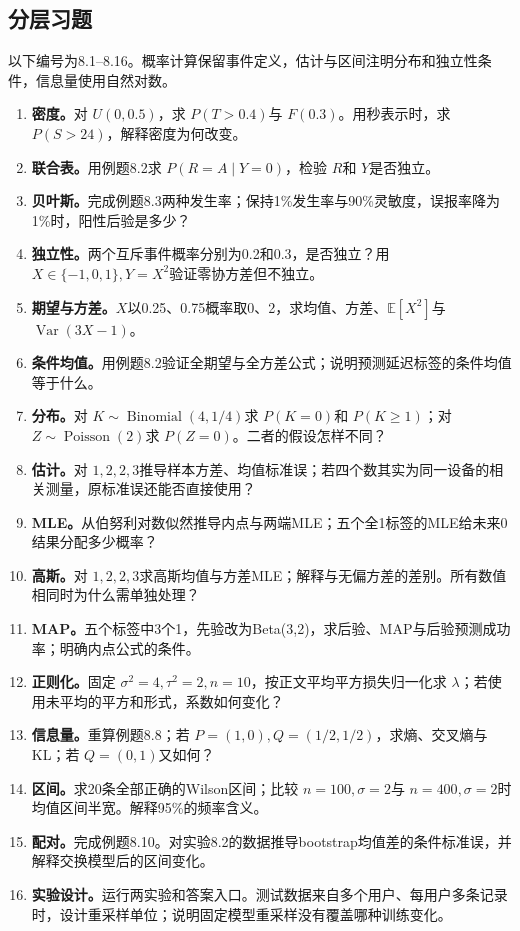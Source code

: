 \documentclass[UTF8,fontset=none,zihao=-4,a4paper]{ctexart}
\numberwithin{equation}{section}
\numberwithin{figure}{section}
\begin{document}
\subsection{分层习题}
以下编号为8.1--8.16。概率计算保留事件定义，估计与区间注明分布和独立性条件，信息量使用自然对数。
\begin{enumerate}[label=\textbf{8.\arabic*}]
\item \textbf{密度。}对 $U(0,0.5)$，求 $P(T>0.4)$与 $F(0.3)$。用秒表示时，求 $P(S>24)$，解释密度为何改变。
\item \textbf{联合表。}用例题8.2求 $P(R=A\mid Y=0)$，检验 $R$和 $Y$是否独立。
\item \textbf{贝叶斯。}完成例题8.3两种发生率；保持1\%发生率与90\%灵敏度，误报率降为1\%时，阳性后验是多少？
\item \textbf{独立性。}两个互斥事件概率分别为0.2和0.3，是否独立？用 $X\in\{-1,0,1\},Y=X^2$验证零协方差但不独立。
\item \textbf{期望与方差。}$X$以0.25、0.75概率取0、2，求均值、方差、$\mathbb E[X^2]$与 $\operatorname{Var}(3X-1)$。
\item \textbf{条件均值。}用例题8.2验证全期望与全方差公式；说明预测延迟标签的条件均值等于什么。
\item \textbf{分布。}对 $K\sim\operatorname{Binomial}(4,1/4)$求 $P(K=0)$和 $P(K\ge1)$；对 $Z\sim\operatorname{Poisson}(2)$求 $P(Z=0)$。二者的假设怎样不同？
\item \textbf{估计。}对 $1,2,2,3$推导样本方差、均值标准误；若四个数其实为同一设备的相关测量，原标准误还能否直接使用？
\item \textbf{MLE。}从伯努利对数似然推导内点与两端MLE；五个全1标签的MLE给未来0结果分配多少概率？
\item \textbf{高斯。}对 $1,2,2,3$求高斯均值与方差MLE；解释与无偏方差的差别。所有数值相同时为什么需单独处理？
\item \textbf{MAP。}五个标签中3个1，先验改为Beta(3,2)，求后验、MAP与后验预测成功率；明确内点公式的条件。
\item \textbf{正则化。}固定 $\sigma^2=4,\tau^2=2,n=10$，按正文平均平方损失归一化求 $\lambda$；若使用未平均的平方和形式，系数如何变化？
\item \textbf{信息量。}重算例题8.8；若 $P=(1,0),Q=(1/2,1/2)$，求熵、交叉熵与KL；若 $Q=(0,1)$又如何？
\item \textbf{区间。}求20条全部正确的Wilson区间；比较 $n=100,\sigma=2$与 $n=400,\sigma=2$时均值区间半宽。解释95\%的频率含义。
\item \textbf{配对。}完成例题8.10。对实验8.2的数据推导bootstrap均值差的条件标准误，并解释交换模型后的区间变化。
\item \textbf{实验设计。}运行两实验和答案入口。测试数据来自多个用户、每用户多条记录时，设计重采样单位；说明固定模型重采样没有覆盖哪种训练变化。
\end{enumerate}
\end{document}
